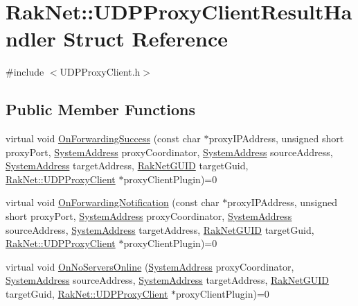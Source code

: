 \hypertarget{struct_rak_net_1_1_u_d_p_proxy_client_result_handler}{\section{Rak\-Net\-:\-:U\-D\-P\-Proxy\-Client\-Result\-Handler Struct Reference}
\label{struct_rak_net_1_1_u_d_p_proxy_client_result_handler}
}


{\ttfamily \#include $<$U\-D\-P\-Proxy\-Client.\-h$>$}

\subsection*{Public Member Functions}
\begin{DoxyCompactItemize}
\item 
virtual void \hyperlink{struct_rak_net_1_1_u_d_p_proxy_client_result_handler_a8052a8af926b913784b3e000416fa128}{On\-Forwarding\-Success} (const char $\ast$proxy\-I\-P\-Address, unsigned short proxy\-Port, \hyperlink{struct_rak_net_1_1_system_address}{System\-Address} proxy\-Coordinator, \hyperlink{struct_rak_net_1_1_system_address}{System\-Address} source\-Address, \hyperlink{struct_rak_net_1_1_system_address}{System\-Address} target\-Address, \hyperlink{struct_rak_net_1_1_rak_net_g_u_i_d}{Rak\-Net\-G\-U\-I\-D} target\-Guid, \hyperlink{class_rak_net_1_1_u_d_p_proxy_client}{Rak\-Net\-::\-U\-D\-P\-Proxy\-Client} $\ast$proxy\-Client\-Plugin)=0
\item 
virtual void \hyperlink{struct_rak_net_1_1_u_d_p_proxy_client_result_handler_a7e6850016de9235b6d3657a76075522c}{On\-Forwarding\-Notification} (const char $\ast$proxy\-I\-P\-Address, unsigned short proxy\-Port, \hyperlink{struct_rak_net_1_1_system_address}{System\-Address} proxy\-Coordinator, \hyperlink{struct_rak_net_1_1_system_address}{System\-Address} source\-Address, \hyperlink{struct_rak_net_1_1_system_address}{System\-Address} target\-Address, \hyperlink{struct_rak_net_1_1_rak_net_g_u_i_d}{Rak\-Net\-G\-U\-I\-D} target\-Guid, \hyperlink{class_rak_net_1_1_u_d_p_proxy_client}{Rak\-Net\-::\-U\-D\-P\-Proxy\-Client} $\ast$proxy\-Client\-Plugin)=0
\item 
virtual void \hyperlink{struct_rak_net_1_1_u_d_p_proxy_client_result_handler_ab253821a987b8423dbc8f903ab8d400c}{On\-No\-Servers\-Online} (\hyperlink{struct_rak_net_1_1_system_address}{System\-Address} proxy\-Coordinator, \hyperlink{struct_rak_net_1_1_system_address}{System\-Address} source\-Address, \hyperlink{struct_rak_net_1_1_system_address}{System\-Address} target\-Address, \hyperlink{struct_rak_net_1_1_rak_net_g_u_i_d}{Rak\-Net\-G\-U\-I\-D} target\-Guid, \hyperlink{class_rak_net_1_1_u_d_p_proxy_client}{Rak\-Net\-::\-U\-D\-P\-Proxy\-Client} $\ast$proxy\-Client\-Plugin)=0

\end{DoxyCompactItemize}
